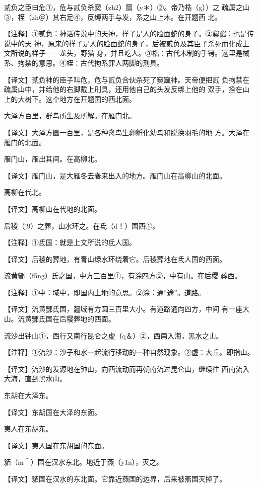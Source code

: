 \documentclass[a4paper,12pt,UTF8,twoside]{ctexbook}
\begin{document}
贰负之臣曰危①，危与贰负杀窫（zh2）窳（y＊）②。帝乃梏（g））之 疏属之山③，桎（zh＠）其右足④，反缚两手与发，系之山上木。在开题西 北。

【注释】①贰负：神话传说中的天神，样子是人的脸面蛇的身子。②窫窳：也是传说中的天 神，原来的样子是人的脸面蛇的身子，后被贰负及其臣子杀死而化成上文所说的样子——龙头，野猫 身，并且吃人。③梏：古代木制的手铐。这里是械系、拘禁的意思。④桎：古代拘系罪人两脚的刑具。

【译文】贰负神的臣子叫危，危与贰负合伙杀死了窫窳神。天帝便把贰 负拘禁在疏属山中，并给他的右脚戴上刑具，还用他自己的头发反绑上他的 双手，拴在山上的大树下。这个地方在开题国的西北面。

大泽方百里，群鸟所生及所解。在雁门北。

【译文】大泽方圆一百里，是各种禽鸟生卵孵化幼鸟和脱换羽毛的地 方。大泽在雁门的北面。

雁门山，雁出其间。在高柳北。

【译文】雁门山，是大雁冬去春来出入的地方。雁门山在高柳山的北面。

高柳在代北。

【译文】高柳山在代地的北面。

后稷（j9）之葬，山水环之。在氐（d！）国西①。

【注释】①氐国：就是上文所说的氐人国。

【译文】后稷的葬地，有青山绿水环绕着它。后稷葬地在氐人国的西面。

流黄酆（f5ng）氏之国，中方三百里①，有涂四方②，中有山。在后稷 葬西。

【注释】①中：域中，即国内土地的意思。②涂：通“途”。道路。

【译文】流黄酆氏国，疆域有方圆三百里大小。有道路通向四方，中间 有一座大山。流黄酆氏国在后稷葬地的西面。

流沙出钟山①，西行又南行昆仑之虚（q＆）②，西南入海，黑水之山。

【注释】①流沙：沙子和水一起流行移动的一种自然现象。②虚：大丘。即指山。

【译文】流沙的发源地在钟山，向西流动而再朝南流过昆仑山，继续往 西南流入大海，直到黑水山。

东胡在大泽东。

【译文】东胡国在大泽的东面。

夷人在东胡东。

【译文】夷人国在东胡国的东面。

貊（m＾）国在汉水东北。地近于燕（y1n），灭之。

【译文】貊国在汉水的东北面。它靠近燕国的边界，后来被燕国灭掉了。
\end{document}
